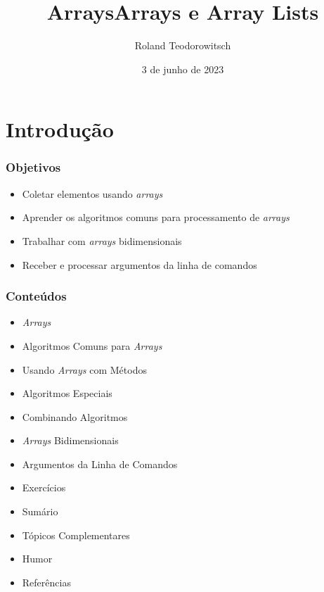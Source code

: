 \documentclass[xcolor={dvipsnames,table},aspectratio=169]{beamer}
\title[\sc{Arrays}]{Arrays}
\title[\sc{Arrays e Array Lists}]{Arrays e Array Lists}
\author[Roland Teodorowitsch]{Roland Teodorowitsch}
\institute[FPROG - EP - PUCRS]{Fundamentos de Programação - Escola Politécnica - PUCRS}
\date{3 de junho de 2023}
\begin{document}
\justifying

\begin{frame}
	\titlepage
\end{frame}

\section{Introdução}

\begin{frame}\frametitle{Objetivos}
\begin{itemize}
	\item Coletar elementos usando \emph{arrays}
	\item Aprender os algoritmos comuns para processamento de \emph{arrays}
	\item Trabalhar com \emph{arrays} bidimensionais
	\item Receber e processar argumentos da linha de comandos
\end{itemize}
\end{frame}

\begin{frame}\frametitle{Conteúdos}
\begin{itemize}
	\item \emph{Arrays}
	\item Algoritmos Comuns para \emph{Arrays}
	\item Usando \emph{Arrays} com Métodos
	\item Algoritmos Especiais
	\item Combinando Algoritmos
	\item \emph{Arrays} Bidimensionais
	\item Argumentos da Linha de Comandos
	\item Exercícios
	\item Sumário
	\item Tópicos Complementares
	\item Humor
	\item Referências
\end{itemize}
\end{frame}
\end{document}
